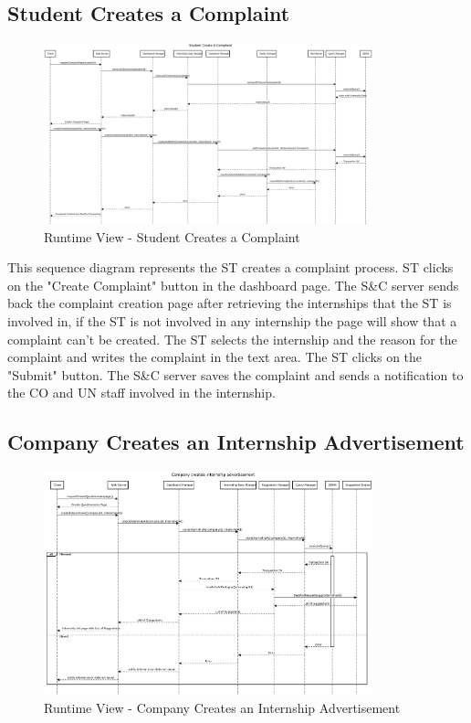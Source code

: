 \subsection{Student Creates a Complaint}
\label{sub:student-creates-a-complaint}%

\begin{figure}[H]
      \centering
      \includegraphics[width=0.85\textwidth]{Images/RV_05.pdf}
      \caption{Runtime View - Student Creates a Complaint}
      \label{fig:rv-student-creates-a-complaint}
\end{figure}

\par This sequence diagram represents the ST creates a complaint process. ST clicks on the "Create Complaint" button in the
dashboard page. The S\&C server sends back the complaint creation page after retrieving the internships that the ST is involved in,
if the ST is not involved in any internship the page will show that a complaint can't be created. The ST selects the internship
and the reason for the complaint and writes the complaint in the text area. The ST clicks on the "Submit" button. The S\&C server
saves the complaint and sends a notification to the CO and UN staff involved in the internship.

\subsection{Company Creates an Internship Advertisement}
\label{sub:company-creates-an-internship-advertisement}%

\begin{figure}[H]
      \centering
      \includegraphics[width=0.85\textwidth]{Images/RV_06.pdf}
      \caption{Runtime View - Company Creates an Internship Advertisement}
      \label{fig:rv-company-creates-an-internship-advertisement}
\end{figure}

